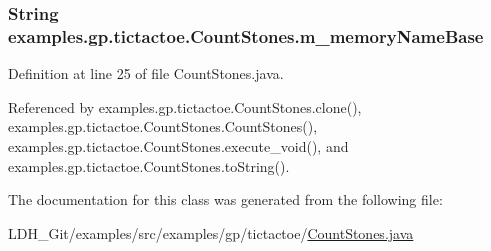 \hypertarget{classexamples_1_1gp_1_1tictactoe_1_1_count_stones_aa4a0e1de59b6ed66286a931f11366006}{
\subsubsection[{m\-\_\-memory\-Name\-Base}]{\setlength{\rightskip}{0pt plus 5cm}String examples.\-gp.\-tictactoe.\-Count\-Stones.\-m\-\_\-memory\-Name\-Base\hspace{0.3cm}{\ttfamily [private]}}}\label{classexamples_1_1gp_1_1tictactoe_1_1_count_stones_aa4a0e1de59b6ed66286a931f11366006}


Definition at line 25 of file Count\-Stones.\-java.



Referenced by examples.\-gp.\-tictactoe.\-Count\-Stones.\-clone(), examples.\-gp.\-tictactoe.\-Count\-Stones.\-Count\-Stones(), examples.\-gp.\-tictactoe.\-Count\-Stones.\-execute\-\_\-void(), and examples.\-gp.\-tictactoe.\-Count\-Stones.\-to\-String().



The documentation for this class was generated from the following file\-:\begin{DoxyCompactItemize}
\item 
L\-D\-H\-\_\-\-Git/examples/src/examples/gp/tictactoe/\hyperlink{_count_stones_8java}{Count\-Stones.\-java}\end{DoxyCompactItemize}
